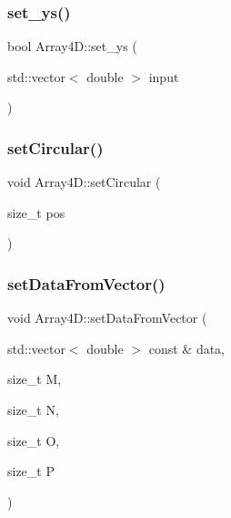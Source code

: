 \subsubsection{\texorpdfstring{set\+\_\+ys()}{set\_ys()}}
{\footnotesize\ttfamily bool Array4\+D\+::set\+\_\+ys (\begin{DoxyParamCaption}\item[{std\+::vector$<$ double $>$}]{input }\end{DoxyParamCaption})}

\mbox{\label{class_array4_d_ab4574e45a22610a3e9768542afe76797}} 
\subsubsection{\texorpdfstring{set\+Circular()}{setCircular()}}
{\footnotesize\ttfamily void Array4\+D\+::set\+Circular (\begin{DoxyParamCaption}\item[{size\+\_\+t}]{pos }\end{DoxyParamCaption})}

\mbox{\label{class_array4_d_af6879e11496cc7a736b813bbdeccd5d5}} 
\subsubsection{\texorpdfstring{set\+Data\+From\+Vector()}{setDataFromVector()}}
{\footnotesize\ttfamily void Array4\+D\+::set\+Data\+From\+Vector (\begin{DoxyParamCaption}\item[{std\+::vector$<$ double $>$ const \&}]{data,  }\item[{size\+\_\+t}]{M,  }\item[{size\+\_\+t}]{N,  }\item[{size\+\_\+t}]{O,  }\item[{size\+\_\+t}]{P }\end{DoxyParamCaption})}

\mbox{\label{class_array4_d_a27a7b3dc2759941c5849a3843d9ad5d1}} 
